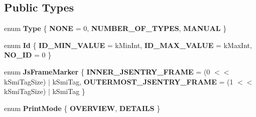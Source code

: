 \subsection*{Public Types}
\begin{DoxyCompactItemize}
\item 
\mbox{\label{classv8_1_1internal_1_1StackFrame_a539db1a450ec470771bfb8f4995cee9b}} 
enum {\bfseries Type} \{ {\bfseries N\+O\+NE} = 0, 
{\bfseries N\+U\+M\+B\+E\+R\+\_\+\+O\+F\+\_\+\+T\+Y\+P\+ES}, 
{\bfseries M\+A\+N\+U\+AL}
 \}
\item 
\mbox{\label{classv8_1_1internal_1_1StackFrame_ad77512257703c6f7ed72645ca5a54aba}} 
enum {\bfseries Id} \{ {\bfseries I\+D\+\_\+\+M\+I\+N\+\_\+\+V\+A\+L\+UE} = k\+Min\+Int, 
{\bfseries I\+D\+\_\+\+M\+A\+X\+\_\+\+V\+A\+L\+UE} = k\+Max\+Int, 
{\bfseries N\+O\+\_\+\+ID} = 0
 \}
\item 
\mbox{\label{classv8_1_1internal_1_1StackFrame_ae414b30b6b5a49e66aae840c87dc2fe9}} 
enum {\bfseries Js\+Frame\+Marker} \{ {\bfseries I\+N\+N\+E\+R\+\_\+\+J\+S\+E\+N\+T\+R\+Y\+\_\+\+F\+R\+A\+ME} = (0 $<$$<$ k\+Smi\+Tag\+Size) $\vert$ k\+Smi\+Tag, 
{\bfseries O\+U\+T\+E\+R\+M\+O\+S\+T\+\_\+\+J\+S\+E\+N\+T\+R\+Y\+\_\+\+F\+R\+A\+ME} = (1 $<$$<$ k\+Smi\+Tag\+Size) $\vert$ k\+Smi\+Tag
 \}
\item 
\mbox{\label{classv8_1_1internal_1_1StackFrame_abe64e1340233eb31145fd14e7c5ee433}} 
enum {\bfseries Print\+Mode} \{ {\bfseries O\+V\+E\+R\+V\+I\+EW}, 
{\bfseries D\+E\+T\+A\+I\+LS}
 \}
\end{DoxyCompactItemize}
